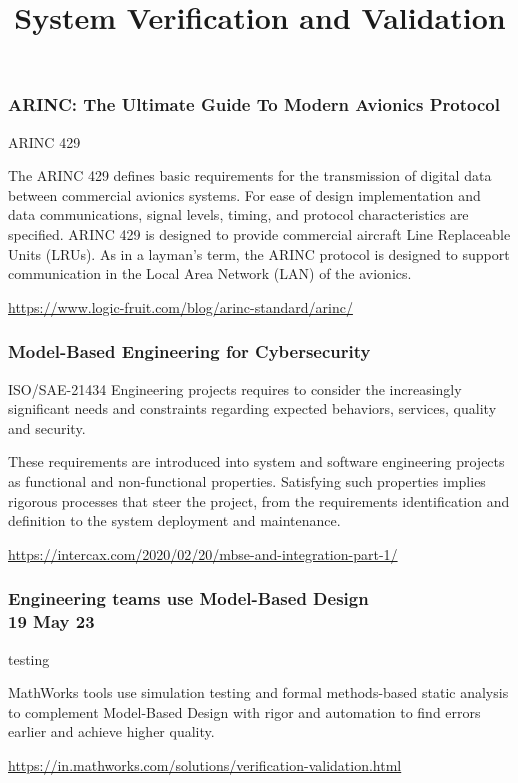 \begin{frame}
\frametitle{ARINC: The Ultimate Guide To Modern Avionics Protocol}
\begin{block}{ ARINC 429 }

The ARINC 429 defines basic requirements for the transmission of digital data between commercial avionics systems. For ease of design implementation and data communications, signal levels, timing, and protocol characteristics are specified. ARINC 429 is designed to provide commercial aircraft Line Replaceable Units (LRUs). As in a layman’s term, the ARINC protocol is designed to support communication in the Local Area Network (LAN) of the avionics.

 \url{https://www.logic-fruit.com/blog/arinc-standard/arinc/}

\end{block}
\end{frame}




\begin{frame}
\frametitle{Model-Based Engineering for Cybersecurity}

\begin{block}{ISO/SAE-21434  }
Engineering projects requires to consider the increasingly significant needs and constraints regarding expected behaviors, services, quality and security. 

These requirements are introduced into system and software engineering projects as functional and non-functional properties. Satisfying such properties implies rigorous processes that steer the project, from the requirements identification and definition to the system deployment and maintenance. 

\url{https://intercax.com/2020/02/20/mbse-and-integration-part-1/}


\end{block}
\end{frame}



\newpage 

\title[Systems Engineering]{ System Verification and Validation  } 



\begin{frame}
\frametitle{Engineering teams use Model-Based Design 
 \\ 19 May 23 }
\begin{block}{testing   }

MathWorks tools use simulation testing and formal methods-based static analysis to complement Model-Based Design with rigor and automation to find errors earlier and achieve higher quality.

\url{https://in.mathworks.com/solutions/verification-validation.html}

\end{block}
\end{frame}

